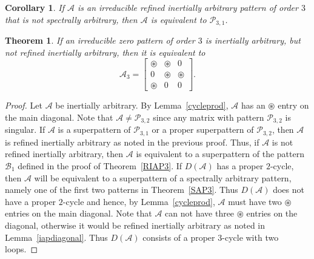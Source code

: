 \documentclass[10pt]{amsart}
\newtheorem{theorem}[proposition]{Theorem}
\newtheorem{corollary}[proposition]{Corollary}
\begin{document}
\begin{corollary}
If ${\mathcal{A}}$ is an   
irreducible refined inertially arbitrary pattern of order $3$ that is not spectrally arbitrary, 
then ${\mathcal{A}}$ is equivalent to ${\mathcal{P}}_{3,1}$.  
\end{corollary}

\begin{theorem}\label{minIAP} If an irreducible zero pattern of order $3$ is inertially
arbitrary, but not refined inertially arbitrary, then it is equivalent to
$${\mathcal{A}}_3 = \left[ \begin{array}{ccc}
{\circledast} & {\circledast} & 0 \\
0 & {\circledast} & {\circledast} \\
{\circledast} & 0 & 0 \end{array} \right].$$
\end{theorem}

\begin{proof}
Let ${\mathcal{A}}$ be inertially arbitrary. By Lemma~\ref{cycleprod}, ${\mathcal{A}}$ has an ${\circledast}$ entry on the
main diagonal.  Note that ${\mathcal{A}}\neq{\mathcal{P}}_{3,2}$ since any matrix with pattern ${\mathcal{P}}_{3,2}$ is singular.
If ${\mathcal{A}}$ is a superpattern of ${\mathcal{P}}_{3,1}$ or a proper superpattern of ${\mathcal{P}}_{3,2}$,
 then ${\mathcal{A}}$ is refined inertially arbitrary as noted in the previous
proof. Thus, if ${\mathcal{A}}$ is not refined inertially arbitrary, then ${\mathcal{A}}$ is equivalent to a superpattern of the pattern ${\mathcal{B}}_1$
defined in the proof of Theorem~\ref{RIAP3}. 
 If $D({\mathcal{A}})$ has a proper $2$-cycle, then ${\mathcal{A}}$ will be equivalent to a superpattern of a
spectrally arbitrary pattern, namely one of the first two patterns in Theorem~\ref{SAP3}. Thus $D({\mathcal{A}})$ does not
have a proper $2$-cycle and hence,  by Lemma~\ref{cycleprod}, ${\mathcal{A}}$ must have two ${\circledast}$ entries on the main diagonal.  
Note that ${\mathcal{A}}$ can not have three ${\circledast}$ entries on the diagonal, otherwise it would be 
refined inertially arbitrary as noted in Lemma~\ref{iapdiagonal}.
Thus $D({\mathcal{A}})$ consists of a proper $3$-cycle with two loops. 
\end{proof}
\end{document}
